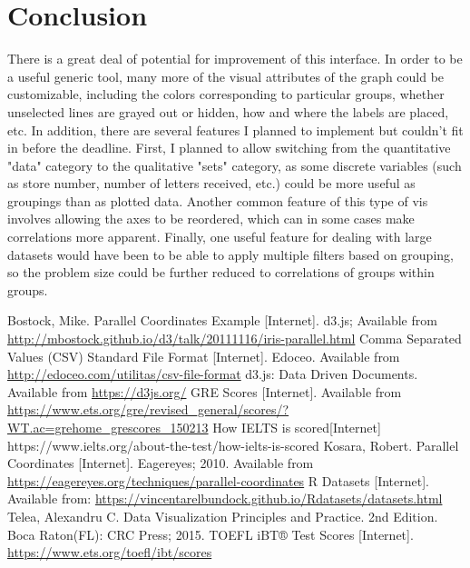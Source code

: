 \documentclass[]{article}
\begin{document}
\section{Conclusion}
	There is a great deal of potential for improvement of this interface. In order to be a useful generic tool, many more of the visual attributes of the graph could be customizable, including the colors corresponding to particular groups, whether unselected lines are grayed out or hidden, how and where the labels are placed, etc. In addition, there are several features I planned to implement but couldn't fit in before the deadline. First, I planned to allow switching from the quantitative "data" category to the qualitative "sets" category, as some discrete variables (such as store number, number of letters received, etc.) could be more useful as groupings than as plotted data. Another common feature of this type of vis involves allowing the axes to be reordered, which can in some cases make correlations more apparent. Finally, one useful feature for dealing with large datasets would have been to be able to apply multiple filters based on grouping, so the problem size could be further reduced to correlations of groups within groups.

\vfill

\begin{thebibliography}{11}
		Bostock, Mike. Parallel Coordinates Example [Internet]. d3.js; Available from \url{http://mbostock.github.io/d3/talk/20111116/iris-parallel.html}
		Comma Separated Values (CSV) Standard File Format [Internet]. Edoceo. Available from \url{http://edoceo.com/utilitas/csv-file-format}
		d3.js: Data Driven Documents. Available from \url{https://d3js.org/}
		GRE Scores [Internet]. Available from \url{https://www.ets.org/gre/revised_general/scores/?WT.ac=grehome_grescores_150213}
		How IELTS is scored[Internet] https://www.ielts.org/about-the-test/how-ielts-is-scored
		Kosara, Robert. Parallel Coordinates [Internet]. Eagereyes; 2010. Available from \url{https://eagereyes.org/techniques/parallel-coordinates}
		R Datasets [Internet]. Available from: \url{https://vincentarelbundock.github.io/Rdatasets/datasets.html}
		Telea, Alexandru C. Data Visualization Principles and Practice. 2nd Edition. Boca Raton(FL): CRC Press; 2015.
		TOEFL iBT® Test Scores [Internet]. \url{https://www.ets.org/toefl/ibt/scores}
\end{thebibliography}
\end{document}
